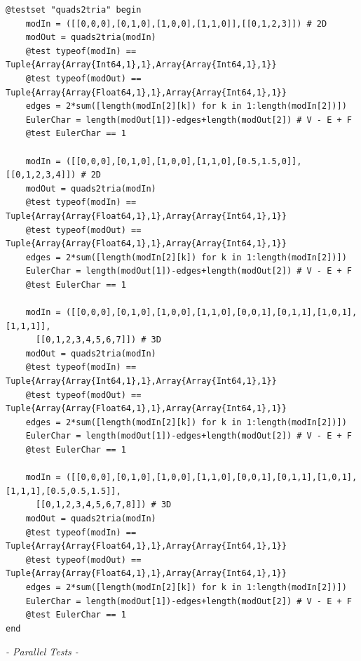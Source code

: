 \documentclass[a4paper,12pt,titlepage]{article}					%
\begin{document}
\begin{Verbatim}
@testset "quads2tria" begin
	modIn = ([[0,0,0],[0,1,0],[1,0,0],[1,1,0]],[[0,1,2,3]]) # 2D
	modOut = quads2tria(modIn)
	@test typeof(modIn) == Tuple{Array{Array{Int64,1},1},Array{Array{Int64,1},1}}
	@test typeof(modOut) == Tuple{Array{Array{Float64,1},1},Array{Array{Int64,1},1}}
	edges = 2*sum([length(modIn[2][k]) for k in 1:length(modIn[2])])
	EulerChar = length(modOut[1])-edges+length(modOut[2]) # V - E + F
	@test EulerChar == 1
	
	modIn = ([[0,0,0],[0,1,0],[1,0,0],[1,1,0],[0.5,1.5,0]],[[0,1,2,3,4]]) # 2D
	modOut = quads2tria(modIn)
	@test typeof(modIn) == Tuple{Array{Array{Float64,1},1},Array{Array{Int64,1},1}}
	@test typeof(modOut) == Tuple{Array{Array{Float64,1},1},Array{Array{Int64,1},1}}
	edges = 2*sum([length(modIn[2][k]) for k in 1:length(modIn[2])])
	EulerChar = length(modOut[1])-edges+length(modOut[2]) # V - E + F
	@test EulerChar == 1
	
	modIn = ([[0,0,0],[0,1,0],[1,0,0],[1,1,0],[0,0,1],[0,1,1],[1,0,1],[1,1,1]],
	  [[0,1,2,3,4,5,6,7]]) # 3D
	modOut = quads2tria(modIn)
	@test typeof(modIn) == Tuple{Array{Array{Int64,1},1},Array{Array{Int64,1},1}}
	@test typeof(modOut) == Tuple{Array{Array{Float64,1},1},Array{Array{Int64,1},1}}
	edges = 2*sum([length(modIn[2][k]) for k in 1:length(modIn[2])])
	EulerChar = length(modOut[1])-edges+length(modOut[2]) # V - E + F
	@test EulerChar == 1
	
	modIn = ([[0,0,0],[0,1,0],[1,0,0],[1,1,0],[0,0,1],[0,1,1],[1,0,1],[1,1,1],[0.5,0.5,1.5]],
	  [[0,1,2,3,4,5,6,7,8]]) # 3D
	modOut = quads2tria(modIn)
	@test typeof(modIn) == Tuple{Array{Array{Float64,1},1},Array{Array{Int64,1},1}}
	@test typeof(modOut) == Tuple{Array{Array{Float64,1},1},Array{Array{Int64,1},1}}
	edges = 2*sum([length(modIn[2][k]) for k in 1:length(modIn[2])])
	EulerChar = length(modOut[1])-edges+length(modOut[2]) # V - E + F
	@test EulerChar == 1
end
\end{Verbatim}

\emph{- Parallel Tests -}
\end{document}
